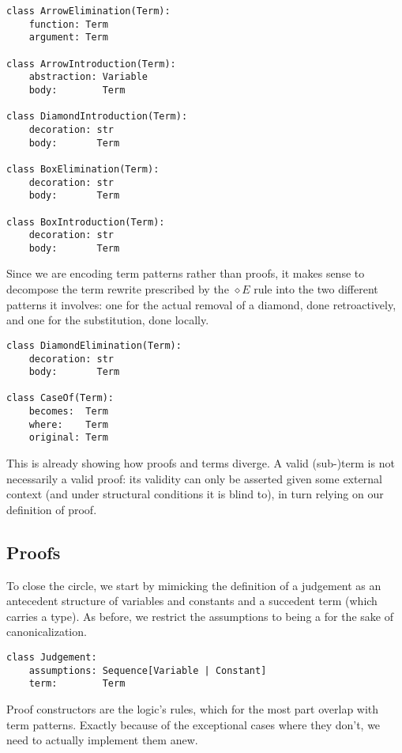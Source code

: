 \begin{verbatim}
class ArrowElimination(Term):
    function: Term
    argument: Term

class ArrowIntroduction(Term):
    abstraction: Variable
    body:        Term

class DiamondIntroduction(Term):
    decoration: str
    body:       Term

class BoxElimination(Term):
    decoration: str
    body:       Term

class BoxIntroduction(Term):
    decoration: str
    body:       Term
\end{verbatim}

\noindent Since we are encoding term patterns rather than proofs, it makes sense to decompose the term rewrite prescribed by the $\diamond E$ rule into the two different patterns it involves: one for the actual removal of a diamond, done retroactively, and one for the substitution, done locally.

\begin{verbatim}
class DiamondElimination(Term):
    decoration: str
    body:       Term

class CaseOf(Term):
    becomes:  Term
    where:    Term
    original: Term
\end{verbatim}

\noindent This is already showing how proofs and terms diverge.
A valid (sub-)term is not necessarily a valid proof:  its validity can only be asserted given some external context (and under structural conditions it is blind to), in turn relying on our definition of proof.

\subsection{Proofs}
To close the circle, we start by mimicking the definition of a judgement as an antecedent structure of variables and constants and a succedent term (which carries a type).
As before, we restrict the assumptions to being a  for the sake of canonicalization.

\begin{verbatim}
class Judgement:
    assumptions: Sequence[Variable | Constant]
    term:        Term
\end{verbatim}

\noindent Proof constructors are the logic's rules, which for the most part overlap with term patterns.
Exactly because of the exceptional cases where they don't, we need to actually implement them anew.

